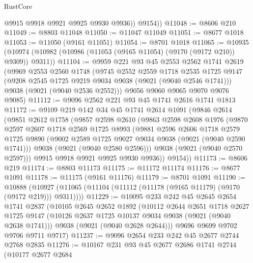 \begin{lexlean}{RustCore}
\begin{coremodule}
            @9915
            @9918
            @9921
            @9925
            @9930
            @9936))
        @9154))
@11048 := @8606 @210
@11049 := @8803 @11048
@11050 := @11047 @11049
@11051 := @8677 @1018
@11053 := @11050 (@9161 @11051)
@11054 := @8701 @1018
@11065 := @10935 (@10974 (@10982 (@10986 (@11053 (@9165 @11054) (@9170 (@9172 @210)) @9309)) @9311))
@11104 := @9959
    @221
    @93
    @45
    @2553
    @2562
    @1741
    @2619
    (@9969
      @2553
      @2560
      @1748
      (@9745
        @2552
        @2559
        @1718
        @2535
        @1725
        @9147
        (@9208 @2545 @1725 @9219 @9034 @9038 (@9021 (@9040 @2546 @1741)))
        @9038
        (@9021 (@9040 @2536 @2552)))
      @9056
      @9060
      @9065
      @9070
      @9076
      @9085)
@11112 := @9096 @2562 @221 @93 @45 @1741 @2616 @1741 @1813
@11172 := @9109
    @219
    @142
    @34
    @45
    @1741
    @2614
    @1091
    (@9846
      @2614
      (@9851
        @2612
        @1758
        (@9857
          @2598
          @2610
          (@9863
            @2598
            @2608
            @1976
            (@9870
              @2597
              @2607
              @1718
              @2569
              @1725
              @8993
              (@9881
                @2596
                @2606
                @1718
                @2579
                @1725
                @9890
                (@9002 @2589 @1725 @9027 @9034 @9038 (@9021 (@9040 @2590 @1741)))
                @9038
                (@9021 (@9040 @2580 @2596)))
              @9038
              (@9021 (@9040 @2570 @2597)))
            @9915
            @9918
            @9921
            @9925
            @9930
            @9936))
        @9154))
@11173 := @8606 @219
@11174 := @8803 @11173
@11175 := @11172 @11174
@11176 := @8677 @1091
@11178 := @11175 (@9161 @11176)
@11179 := @8701 @1091
@11190 := @10888
    (@10927 (@11065 (@11104 (@11112 (@11178 (@9165 @11179) (@9170 (@9172 @219))) @9311))))
@11229 := @10095
    @233
    @242
    @45
    @2645
    @2654
    @1741
    @2837
    (@10105
      @2645
      @2652
      @1892
      (@10112
        @2644
        @2651
        @1718
        @2627
        @1725
        @9147
        (@10126 @2637 @1725 @10137 @9034 @9038 (@9021 (@9040 @2638 @1741)))
        @9038
        (@9021 (@9040 @2628 @2644)))
      @9696
      @9699
      @9702
      @9706
      @9711
      @9717)
@11237 := @9096 @2654 @233 @242 @45 @2677 @2744 @2768 @2835
@11276 := @10167
    @231
    @93
    @45
    @2677
    @2686
    @1741
    @2744
    (@10177
      @2677
      @2684

\end{coremodule}
\end{lexlean}
